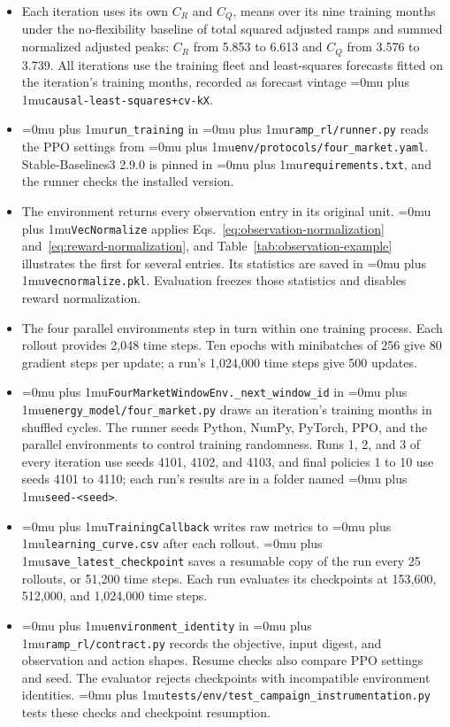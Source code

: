 \documentclass{UNCC-thesis}
\newcommand{\codepath}[1]{{\Urlmuskip=0mu plus 1mu\relax\nolinkurl{#1}}}
\begin{document}
\begin{itemize}
  \item Each iteration uses its own \(C_R\) and \(C_Q\), means over its nine
        training months under the no-flexibility baseline of total squared adjusted ramps
        and summed normalized adjusted peaks: \(C_R\) from 5.853 to 6.613 and
        \(C_Q\) from 3.576 to 3.739. All iterations use the training fleet and
        least-squares forecasts fitted on the iteration's
        training months, recorded as forecast vintage
        \codepath{causal-least-squares+cv-kX}.
  \item \codepath{run_training} in \codepath{ramp_rl/runner.py} reads the
        PPO settings from \codepath{env/protocols/four_market.yaml}.
        Stable-Baselines3 2.9.0 is pinned in \codepath{requirements.txt},
        and the runner checks the installed version.
  \item The environment returns every observation entry in its original unit.
        \codepath{VecNormalize} applies
        Eqs.~\eqref{eq:observation-normalization}
        and~\eqref{eq:reward-normalization}, and
        Table~\ref{tab:observation-example} illustrates the first for several entries.
        Its statistics are saved in \codepath{vecnormalize.pkl}. Evaluation freezes those
        statistics and disables reward normalization.
  \item The four parallel environments step in turn within one training process.
        Each rollout provides 2,048 time steps. Ten epochs with minibatches
        of 256 give 80 gradient steps per update; a run's 1,024,000
        time steps give 500 updates.
  \item \codepath{FourMarketWindowEnv._next_window_id} in
        \codepath{energy_model/four_market.py} draws an iteration's training
        months in shuffled cycles. The runner seeds Python, NumPy, PyTorch,
        PPO, and the parallel environments to control training randomness.
        Runs 1, 2, and 3 of every iteration use seeds 4101, 4102, and 4103, and
        final policies 1 to 10 use seeds 4101 to 4110; each run's results are
        in a folder named \codepath{seed-<seed>}.
  \item \codepath{TrainingCallback} writes raw metrics to
        \codepath{learning_curve.csv} after each rollout.
        \codepath{save_latest_checkpoint} saves a resumable copy of the run every
        25 rollouts, or 51,200 time steps. Each run evaluates its checkpoints
        at 153,600, 512,000, and 1,024,000 time steps.
  \item \codepath{environment_identity} in \codepath{ramp_rl/contract.py}
        records the objective, input digest, and observation and action
        shapes. Resume checks also compare PPO settings and seed. The
        evaluator rejects checkpoints with incompatible environment
        identities. \codepath{tests/env/test_campaign_instrumentation.py}
        tests these checks and checkpoint resumption.
\end{itemize}
\end{document}
